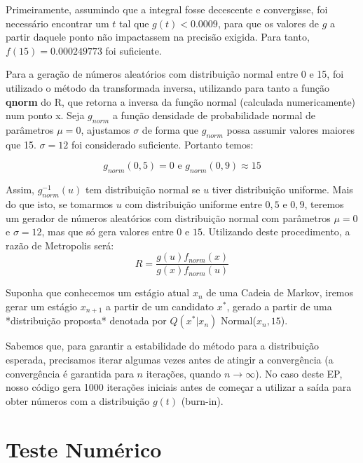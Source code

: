 \documentclass[a4paper,10pt]{article}
\begin{document}
Primeiramente, assumindo que a integral fosse decescente e convergisse, foi necessário encontrar um $t$ tal que $g(t) < 0.0009$, para que os valores de $g$ a partir daquele ponto não impactassem na precisão exigida. Para tanto, $f(15) = 0.000249773$ foi suficiente.

Para a geração de números aleatórios com distribuição normal entre 0 e 15, foi utilizado o método da transformada inversa, 
utilizando para tanto a função \textbf{qnorm} do R, que retorna a inversa da função normal (calculada numericamente) num 
ponto x. Seja $g_{norm}$ a função densidade de probabilidade normal de parâmetros $\mu=0$, ajustamos $\sigma$ de forma que $g_{norm}$ possa assumir valores maiores que 15. $\sigma = 12$ foi considerado suficiente. Portanto temos:

\[g_{norm}(0,5)=0 \textrm{ e } g_{norm}(0,9) \approx 15\]

Assim, $g^{-1}_{norm}(u)$ tem distribuição normal se $u$ tiver distribuição uniforme. Mais do que isto, se tomarmos $u$ com distribuição uniforme entre $0,5 \textrm{ e } 0,9$, teremos um gerador de números aleatórios com distribuição normal com parâmetros
 $\mu=0$ e $\sigma=12$, mas que só gera valores entre $0$ e $15$. Utilizando deste procedimento, a razão de Metropolis será:
\[R=\dfrac{g(u)f_{norm}(x)}{g(x)f_{norm}(u)}\]

Suponha que conhecemos um estágio atual $x_n$ de uma Cadeia de Markov, iremos gerar um estágio $x_{n+1}$ a partir de um candidato $x^*$, gerado a partir de uma *distribuição proposta* denotada por $Q(x^*|x_n)$ Normal($x_n,15$).

Sabemos que, para garantir a estabilidade do método para a distribuição esperada, precisamos iterar algumas vezes antes de 
atingir a convergência (a convergência é garantida para $n$ iterações, quando $n \rightarrow \infty$). No caso deste EP, nosso 
código gera 1000 iterações iniciais antes de começar a utilizar a saída para obter números com a distribuição $g(t)$ (burn-in).

\section{Teste Numérico}
\end{document}
